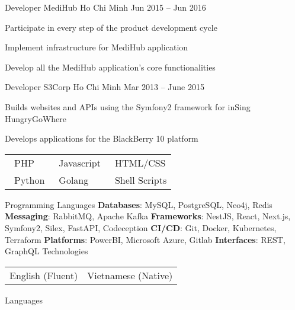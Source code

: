 \documentclass[]{awesome-cv}
\begin{document}
\begin{cventries}
{\begin{cvitems}
		\end{cvitems}}
	\cventry
	{Developer}
	{MediHub}
	{Ho Chi Minh}
	{Jun 2015 – Jun 2016}
	{\begin{cvitems}
		\item {Participate in every step of the product development cycle}
		\item {Implement infrastructure for MediHub application}
		\item {Develop all the MediHub application's core functionalities}
		\end{cvitems}}
	\cventry
	{Developer}
	{S3Corp}
	{Ho Chi Minh}
	{Mar 2013 – June 2015}
	{
		\begin{cvitems}
			\item {Builds websites and APIs using the Symfony2 framework for inSing HungryGoWhere}
			\item {Develops applications for the BlackBerry 10 platform}
		\end{cvitems}
	}
\end{cventries}
\begin{cventries}
	\cventry
	{\def\arraystretch{1.15}{\begin{tabular}{p{3cm}@{\hspace{0.1cm}} @{\hspace{0.1cm}}p{3cm}@{\hspace{0.1cm}} @{\hspace{0.1cm}}p{3cm}@{\hspace{0.1cm}} }
		{\faStar \, PHP} & {\faStarHalfO \, Javascript} & {\faStarHalfO \, HTML/CSS} \\
		{\faStarHalfO \, Python} & {\faStarHalfO \, Golang} & {\faStarHalfO \, Shell Scripts} \\
		\end{tabular}}}
	{Programming Languages}
	{}
	{}
	{}
	\cventry
	{
		\textbf{Databases}: MySQL, PostgreSQL, Neo4j, Redis \break
		\textbf{Messaging}: RabbitMQ, Apache Kafka \break
		\textbf{Frameworks}: NestJS, React, Next.js, Symfony2, Silex, FastAPI, Codeception \break
		\textbf{CI/CD}: Git, Docker, Kubernetes, Terraform \break
		\textbf{Platforms}: PowerBI, Microsoft Azure, Gitlab \break
		\textbf{Interfaces}: REST, GraphQL
	}
	{Technologies}
	{}
	{}
	{}
	\cventry
	{\def\arraystretch{1.15}{\begin{tabular}{p{3cm}@{\hspace{0.1cm}} @{\hspace{0.1cm}}p{3cm}@{\hspace{0.1cm}}}
		{English (Fluent)} & {Vietnamese (Native)} \\
		\end{tabular}}}
	{Languages}
	{}
	{}
	{}
\end{cventries}
\end{document}
